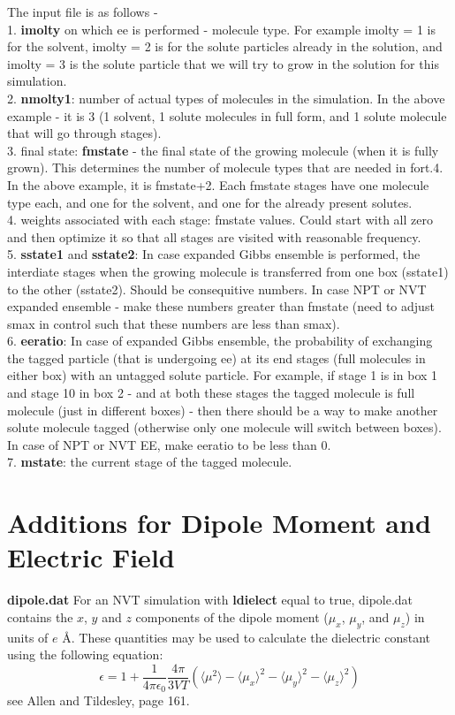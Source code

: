\documentclass[12pt,letterpaper]{article}
\begin{document}
{{{{{{{\noindent  The input file is as follows - \\
1. {\bf imolty} on which ee is performed - molecule type.
For example imolty = 1 is for the solvent, imolty = 2 is for the
solute particles
already in the solution, and imolty = 3 is the solute particle that we
will try to grow in the solution for this simulation. \\
2. {\bf nmolty1}: number of actual types of molecules in the simulation.
In the above example - it is 3 (1 solvent, 1 solute molecules in full
form, and 1 solute molecule that will go through stages). \\
3. final state: {\bf fmstate} - the final state of the growing molecule (when
it is fully grown). This determines the number of molecule types that are
needed in fort.4. In the above example, it is fmstate+2. Each fmstate
stages have one molecule type each, and one for the solvent, and one
for the already present solutes.\\
4. weights associated with each stage: fmstate values. Could start with
all zero and then optimize it so that all stages are visited with
reasonable frequency.\\
5. {\bf sstate1} and {\bf sstate2}: In case expanded Gibbs ensemble is performed,
the interdiate stages when the growing molecule is transferred
from one box (sstate1) to the other (sstate2). Should be consequitive numbers.
In case NPT or NVT expanded ensemble - make these numbers greater than
fmstate (need to adjust smax in control such that these numbers are
less than smax). \\
6. {\bf eeratio}: In case of expanded Gibbs ensemble, the probability of
 exchanging the tagged particle (that is undergoing ee) at its
end stages (full molecules in either box) with an untagged solute particle.
For example, if stage 1 is in box 1 and stage 10 in box 2 - and
at both these stages the tagged molecule is full molecule (just in different
boxes) - then there should be a way to make another solute molecule
tagged (otherwise only one molecule will switch between boxes).
In case of NPT or NVT EE, make eeratio to be less than 0. \\
7. {\bf mstate}: the current stage of the tagged molecule.

\section{Additions for Dipole Moment and Electric Field}
\noindent \textbf{dipole.dat} For an NVT simulation with \textbf{ldielect} equal to true, dipole.dat contains the $x$, $y$ and $z$ components of the dipole moment ($\mu_x$, $\mu_y$, and $\mu_z$) in units of $e $ \AA.  These quantities may be used to calculate the dielectric constant using the following equation:
\begin{equation} 
\epsilon = 1 + \frac{1}{4 \pi \epsilon_0} \frac{4 \pi}{3 V T} \left ( \langle \mu^2 \rangle -
 \langle \mu_x \rangle^2  - \langle \mu_y \rangle^2 - \langle \mu_z \rangle^2 \right )
\end{equation}
see Allen and Tildesley, page 161.

}}}}}}}
\end{document}
